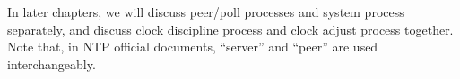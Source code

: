 In later chapters, we will discuss peer/poll processes and system process
separately, and discuss clock discipline process and clock adjust process
together. Note that, in NTP official documents, ``server'' and ``peer'' are
used interchangeably.




